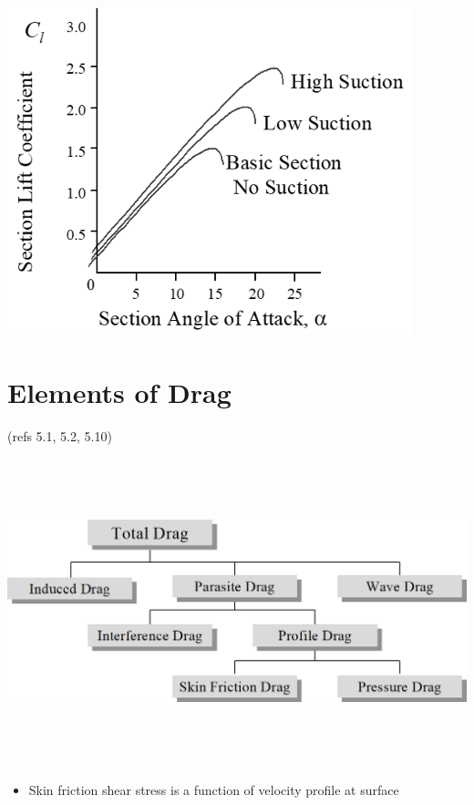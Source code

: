 \documentclass[
]{book}
\providecommand{\tightlist}{%
  \setlength{\itemsep}{0pt}\setlength{\parskip}{0pt}}
\begin{document}
\includegraphics[width=4.625in,height=3.738in]{media/05/image23.png}

\hypertarget{elements-of-drag}{%
\section{Elements of Drag}\label{elements-of-drag}}

(refs 5.1, 5.2, 5.10)

\includegraphics[width=8.8in,height=3.5in]{media/05/image24.png}

\begin{itemize}
\tightlist
\item
  Skin friction shear stress is a function of velocity profile at surface
\end{itemize}
\end{document}
